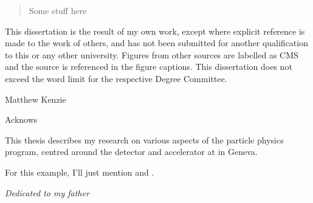 
\begin{abstract}%
  Some stuff here
\end{abstract}


\begin{declaration}
  This dissertation is the result of my own work, except where explicit
  reference is made to the work of others, and has not been submitted
  for another qualification to this or any other university. Figures from other
  sources are labelled as CMS and the source is referenced in the figure captions.
  This dissertation does not exceed the word limit for the respective Degree
  Committee.
  \vspace*{1cm}
  \begin{flushright}
    Matthew Kenzie
  \end{flushright}
\end{declaration}


\begin{acknowledgements}
  Acknows
\end{acknowledgements}


\begin{preface}
  This thesis describes my research on various aspects of the \LHCb
  particle physics program, centred around the \LHCb detector and \LHC
  accelerator at \CERN in Geneva.

  \noindent
  For this example, I'll just mention 
  and .
\end{preface}

\newpage
\begin{center}
\vspace*{10cm}
\textit{Dedicated to my father}
\end{center}

\tableofcontents


